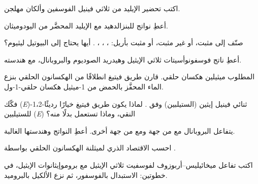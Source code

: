 \begin{exercise}[$\star$]\label{exo:b2:wittig:1}
اكتب تحضير الإيليد  من ثلاثي فينيل الفوسفين وألكان مهلجن.
\end{exercise}

\begin{exercise}[$\star$]\label{exo:b2:wittig:2}
أعطِ نواتج  للبنزالدهيد مع الإيليد المحضَّر من اليودوميثان.
\end{exercise}

\begin{exercise}[$\star$]\label{exo:b2:wittig:3}
صنّف إلى مثبت، أو غير مثبت، أو مثبت بأريل: ، ،
، . أيها يحتاج إلى البيوتيل ليثيوم؟
\end{exercise}

\begin{exercise}[$\star$]\label{exo:b2:wittig:4}
أعطِ ناتج فوسفونوأسيتات ثلاثي الإيثيل وهيدريد الصوديوم والبروبانال، مع هندسته.
\end{exercise}

\begin{exercise}[$\star\star$]\label{exo:b2:wittig:5}
المطلوب ميثيلين هكسان حلقي. قارن طريق فيتيغ انطلاقًا من الهكسانون الحلقي بنزع الماء المحفَّز بالحمض
من 1-ميثيل هكسان حلقي-1-ول.
\end{exercise}

\begin{exercise}[$\star\star$]\label{exo:b2:wittig:6}
فكّك (\textit{E})-1،2-ثنائي فينيل إيثين (الستيلبين) وفق . لماذا يكون طريق فيتيغ
خيارًا رديئًا للستيلبين (\textit{E}) النقي، وماذا تستعمل بدلًا منه؟
\end{exercise}

\begin{exercise}[$\star\star$]\label{exo:b2:wittig:7}
يتفاعل البروبانال مع  من جهة ومع  من جهة أخرى. أعطِ
النواتج وهندستها الغالبة.
\end{exercise}

\begin{exercise}[$\star\star$]\label{exo:b2:wittig:8}
احسب الاقتصاد الذري لميثلنة الهكسانون الحلقي بواسطة .
\end{exercise}

\begin{exercise}[$\star\star$]\label{exo:b2:wittig:9}
اكتب تفاعل ميخائيليس--أربوزوف لفوسفيت ثلاثي الإيثيل مع بروموإيثانوات الإيثيل، في خطوتين:
الاستبدال بالفوسفور، ثم نزع الألكيل بالبروميد.
\end{exercise}

